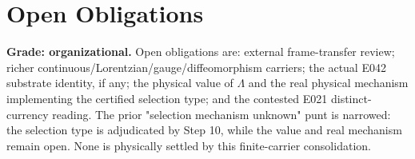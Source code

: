 \documentclass[11pt]{article}
\begin{document}
\section{Open Obligations}

\textbf{Grade: organizational.}
Open obligations are: external frame-transfer review; richer continuous/Lorentzian/gauge/diffeomorphism carriers; the actual E042 substrate identity, if any; the physical value of \(\Lambda\) and the real physical mechanism implementing the certified selection type; and the contested E021 distinct-currency reading. The prior "selection mechanism unknown" punt is narrowed: the selection type is adjudicated by Step 10, while the value and real mechanism remain open. None is physically settled by this finite-carrier consolidation.
\end{document}
